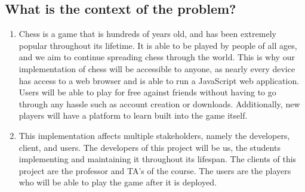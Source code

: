 \documentclass{article}
\begin{document}
\subsection{What is the context of the problem?}
\begin{enumerate}[label={}]
    \item Chess is a game that is hundreds of years old, and has been extremely popular throughout its lifetime. It is able to be played by people of all ages, and we aim to continue spreading chess through the world. This is why our implementation of chess will be accessible to anyone, as nearly every device has access to a web browser and is able to run a JavaScript web application. Users will be able to play for free against friends without having to go through any hassle such as account creation or downloads. Additionally, new players will have a platform to learn built into the game itself. 
    
    \item This implementation affects multiple stakeholders, namely the developers, client, and users. The developers of this project will be us, the students implementing and maintaining it throughout its lifespan. The clients of this project are the professor and TA's of the course. The users are the players who will be able to play the game after it is deployed.
\end{enumerate}
\end{document}
